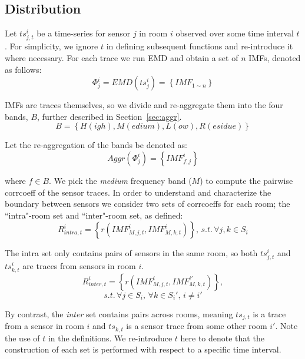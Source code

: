 \subsection{Distribution}
Let $ts^{i}_{j,t}$ be a time-series for sensor $j$ in room $i$ observed over some time interval $t$.  For simplicity, we ignore
$t$ in defining subsequent functions and re-introduce it where necessary.
For each trace we run EMD and obtain a set of $n$ IMFs, denoted as follows:
\begin{displaymath}
\Phi^i_j = EMD(ts^i_j) = \left \{ IMF_{1\sim n} \right \}
\end{displaymath}

IMFs are traces themselves, so we divide and re-aggregate them into the four bands, $B$,
further described in Section~\ref{sec:aggr}.
\begin{displaymath}
B = \left \{ H(igh), M(edium), L(ow), R(esidue) \right \}
\end{displaymath} 

Let the re-aggregation of the bands be denoted as:
\begin{displaymath}
Aggr(\Phi^i_j) = \left \{ IMF^i_{f,j} \right \}
\end{displaymath} 

where $f \in B$.  We pick the \emph{medium} frequency band ($M$) to compute the pairwise corrcoeff of the sensor traces. 
In order to understand and characterize the boundary between sensors we consider two sets of corrcoeffs for each room; the ``intra"-room set and 
``inter"-room set, as defined:
\begin{displaymath}
R^{i}_{intra,t} = \left \{ r(IMF^{i}_{M,j,t}, IMF^{i}_{M,k,t}) \right \}, \,
s.t.\, \forall j,k \in S_i
\end{displaymath}

The intra set only contains pairs of sensors in the same room, so both $ts^{i}_{j,t}$ and $ts^{i}_{k,t}$ are traces from 
sensors in room $i$.
\begin{displaymath}
R^{i}_{inter,t} = \left \{ r(IMF^{i}_{M,j,t}, IMF^{i'}_{M,k,t}) \right \},
\end{displaymath}
\begin{displaymath}
s.t. \, \forall j \in S_i, \, \forall k \in S_i', \, i \neq i' 
\end{displaymath}

By contrast, the \emph{inter} set contains pairs across rooms, meaning $ts_{j,t}$ is a trace from a sensor in room $i$ and 
$ts_{k,t}$ is a sensor trace from some other room $i'$.  %
Note the use of $t$ in the definitions.  We re-introduce $t$ here to denote that the construction of each set is performed with respect to a specific time interval.

